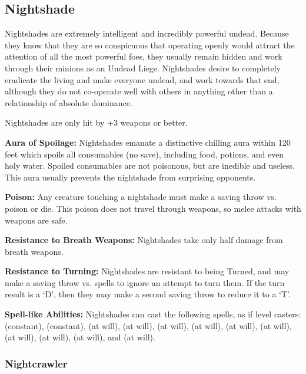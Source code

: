 \begin{multicols*}{2}
\subsection{Nightshade}
Nightshades are extremely intelligent and incredibly powerful undead. Because they know that they are so conspicuous that operating openly would attract the attention of all the most powerful foes, they usually remain hidden and work through their minions as an Undead Liege. Nightshades desire to completely eradicate the living and make everyone undead, and work towards that end, although they do not co-operate well with others in anything other than a relationship of absolute dominance.

Nightshades are only hit by +3 weapons or better.

\textbf{Aura of Spoilage:} Nightshades emanate a distinctive chilling aura within 120 feet which spoils all consumables (no save), including food, potions, and even holy water. Spoiled consumables are not poisonous, but are inedible and useless. This aura usually prevents the nightshade from surprising opponents.

\textbf{Poison:} Any creature touching a nightshade must make a saving throw vs. poison or die. This poison does not travel through weapons, so melee attacks with weapons are safe.

\textbf{Resistance to Breath Weapons:} Nightshades take only half damage from breath weapons.

\textbf{Resistance to Turning:} Nightshades are resistant to being Turned, and may make a saving throw vs. spells to ignore an attempt to turn them. If the turn result is a ‘D’, then they may make a second saving throw to reduce it to a ‘T’.

\textbf{Spell-like Abilities:} Nightshades can cast the following spells, as if  level casters:  (constant),  (constant),  (at will),  (at will),  (at will),  (at will),  (at will),  (at will),  (at will),  (at will),  (at will), and  (at will).

\subsubsection{Nightcrawler}
\end{multicols*}
